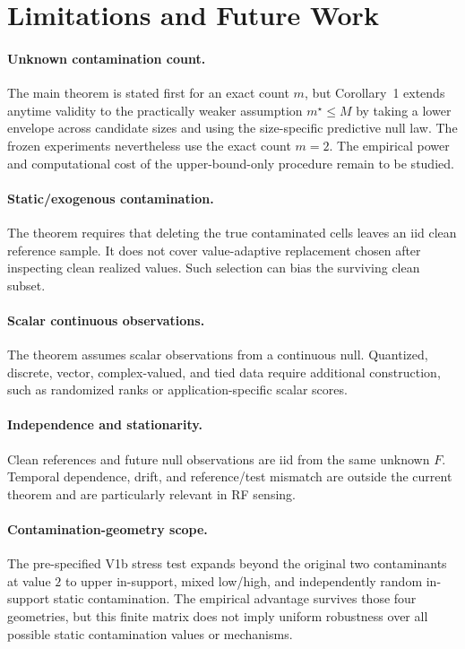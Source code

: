 \section{Limitations and Future Work}

\paragraph{Unknown contamination count.}
The main theorem is stated first for an exact count \(m\), but Corollary~1 extends anytime validity to the practically weaker assumption \(m^\star\le M\) by taking a lower envelope across candidate sizes and using the size-specific predictive null law. The frozen experiments nevertheless use the exact count \(m=2\). The empirical power and computational cost of the upper-bound-only procedure remain to be studied.

\paragraph{Static/exogenous contamination.}
The theorem requires that deleting the true contaminated cells leaves an iid clean reference sample. It does not cover value-adaptive replacement chosen after inspecting clean realized values. Such selection can bias the surviving clean subset.

\paragraph{Scalar continuous observations.}
The theorem assumes scalar observations from a continuous null. Quantized, discrete, vector, complex-valued, and tied data require additional construction, such as randomized ranks or application-specific scalar scores.

\paragraph{Independence and stationarity.}
Clean references and future null observations are iid from the same unknown \(F\). Temporal dependence, drift, and reference/test mismatch are outside the current theorem and are particularly relevant in RF sensing.

\paragraph{Contamination-geometry scope.}
The pre-specified V1b stress test expands beyond the original two contaminants at value \(2\) to upper in-support, mixed low/high, and independently random in-support static contamination. The empirical advantage survives those four geometries, but this finite matrix does not imply uniform robustness over all possible static contamination values or mechanisms.


